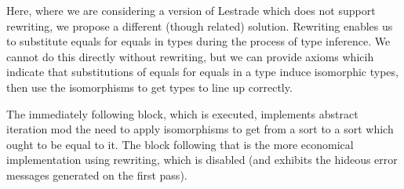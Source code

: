 \documentclass[12pt]{article}
\begin{document}
Here, where we are considering a version of Lestrade which does not support rewriting, we propose a different (though related) solution.  Rewriting enables
us to substitute equals for equals in types during the process of type inference.  We cannot do this directly without rewriting, but we can provide axioms whicih
indicate that substitutions of equals for equals in a type induce isomorphic types, then use the isomorphisms to get types to line up correctly.

The immediately following block, which is executed, implements abstract iteration mod the need to apply isomorphisms to get from a sort to a sort which ought to be equal to it.
The block following that is the more economical implementation using rewriting, which is disabled (and exhibits the hideous error messages generated on the first pass).
\end{document}
